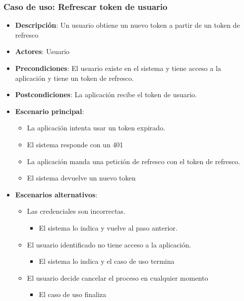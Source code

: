 \documentclass[12pt,a4paperpaper,]{report}
\providecommand{\tightlist}{%
  \setlength{\itemsep}{0pt}\setlength{\parskip}{0pt}}
\begin{document}
\subsubsection{Caso de uso: Refrescar token de
usuario}\label{caso-de-uso-refrescar-token-de-usuario}

\begin{itemize}
\tightlist
\item
  \textbf{Descripción}: Un usuario obtiene un nuevo token a partir de un
  token de refresco
\item
  \textbf{Actores}: Usuario
\item
  \textbf{Precondiciones}: El usuario existe en el sistema y tiene
  acceso a la aplicación y tiene un token de refresco.
\item
  \textbf{Postcondiciones}: La aplicación recibe el token de usuario.
\item
  \textbf{Escenario principal}:

  \begin{itemize}
  \tightlist
  \item
    La aplicación intenta usar un token expirado.
  \item
    El sistema responde con un 401
  \item
    La aplicación manda una petición de refresco con el token de
    refresco.
  \item
    El sistema devuelve un nuevo token
  \end{itemize}
\item
  \textbf{Escenarios alternativos}:

  \begin{itemize}
  \tightlist
  \item
    Las credenciales son incorrectas.

    \begin{itemize}
    \tightlist
    \item
      El sistema lo indica y vuelve al paso anterior.
    \end{itemize}
  \item
    El usuario identificado no tiene acceso a la aplicación.

    \begin{itemize}
    \tightlist
    \item
      El sistema lo indica y el caso de uso termina
    \end{itemize}
  \item
    El usuario decide cancelar el proceso en cualquier momento

    \begin{itemize}
    \tightlist
    \item
      El caso de uso finaliza
    \end{itemize}
  \end{itemize}
\end{itemize}
\end{document}
